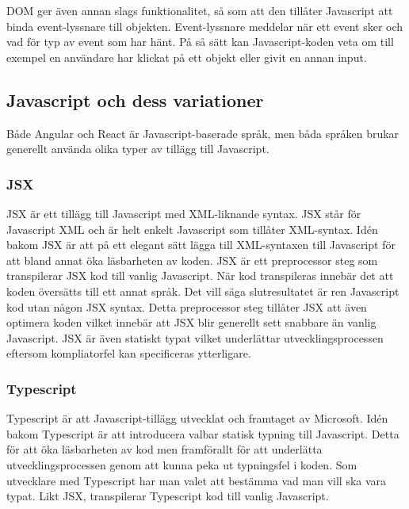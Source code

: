 DOM ger även annan slags funktionalitet, så som att den tillåter Javascript att binda event-lyssnare till objekten.\cite{w3-event} Event-lyssnare meddelar när ett event sker och vad för typ av event som har hänt. På så sätt kan Javascript-koden veta om till exempel en användare har klickat på ett objekt eller givit en annan input.


\subsection{Javascript och dess variationer}
Både Angular och React är Javascript-baserade språk, men båda språken brukar generellt använda olika typer av tillägg till Javascript.

\subsubsection{JSX}
JSX är ett tillägg till Javascript med XML-liknande syntax. JSX står för Javascript XML och är helt enkelt Javascript som tillåter XML-syntax. Idén bakom JSX är att på ett elegant sätt lägga till XML-syntaxen till Javascript för att bland annat öka läsbarheten av koden.\cite{react-jsx} JSX är ett preprocessor steg som transpilerar JSX kod till vanlig Javascript. När kod transpileras innebär det att koden översätts till ett annat språk. Det vill säga slutresultatet är ren Javascript kod utan någon JSX syntax. Detta preprocessor steg  tillåter JSX att även optimera koden vilket innebär att JSX blir generellt sett snabbare än vanlig Javascript.\cite{jsx} \cite{facebook-jsx} JSX är även statiskt typat vilket underlättar utvecklingsprocessen eftersom kompliatorfel kan specificeras ytterligare.


\subsubsection{Typescript}
Typescript är att Javascript-tillägg utvecklat och framtaget av Microsoft. Idén bakom Typescript är att introducera valbar statisk typning till Javascript. \cite{typescript} Detta för att öka läsbarheten av kod men framförallt för att underlätta utvecklingsprocessen genom att kunna peka ut typningsfel i koden. Som utvecklare med Typescript har man valet att bestämma vad man vill ska vara typat. Likt JSX, transpilerar Typescript kod till vanlig Javascript. \cite{typescript-book}

